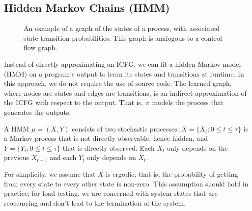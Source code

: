 \subsection{Hidden Markov Chains (HMM)}

\begin{figure}
    \caption{An example of a graph of the states of a process, with associated state transition probabilities. This graph is analogous to a control flow graph.}
    \label{fig:state_graph}
    \vspace{2ex}
\end{figure}

Instead of directly approximating an ICFG, we can fit a hidden Markov model (HMM) on a program's output to learn its states and transitions at runtime. In this approach, we do not require the use of source code. The learned graph, where nodes are states and edges are transitions, is an indirect approximation of the ICFG with respect to the output. That is, it models the process that generates the outputs.

A HMM \(\mu = (X, Y)\) consists of two stochastic processes: \(X = \{X_t : 0 \leq t \leq \tau\}\) is a Markov process that is not directly observable, hence hidden, and \(Y = \{Y_t : 0 \leq t \leq \tau\}\) that is directly observed. Each \(X_t\) only depends on the previous \(X_{t-1}\) and each \(Y_t\) only depends on \(X_t\).

For simplicity, we assume that \(X\) is ergodic; that is, the probability of getting from every state to every other state is non-zero. This assumption should hold in practice; for load testing, we are concerned with system states that are reoccurring and don't lead to the termination of the system.

